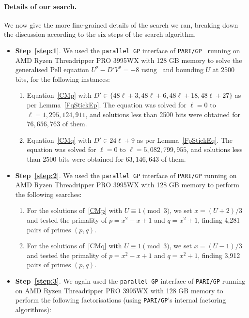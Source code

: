 \documentclass[version=preprint]{iacrcc}
\begin{document}
\paragraph{Details of our search.} We now give the more fine-grained details of the search we ran, breaking down the discussion according to the six steps of the search algorithm. 

\begin{itemize}
\item {\bf Step~\ref{step:1}}. We used the \texttt{parallel GP} interface of \texttt{PARI/GP}~\cite{PARI2} running on AMD Ryzen Threadripper PRO 3995WX with 128 GB memory to solve the generalised Pell equation $U^2-D'V^2=-8$ using~\cite[Algorithm 1]{DBLP:conf/ants/KarabinaT08} and bounding $U$ at 2500 bits, for the following instances:

\begin{enumerate}[label=(\roman*)]
\item Equation~\eqref{CMp} with $D' \in \{48\ell+3, 48\ell+6, 48\ell+18, 48\ell+27\}$ as per Lemma~\ref{FqStickEp}. The equation was solved for $\ell=0$ to $\ell=1,295,124,911$, and solutions less than 2500 bits were obtained for $76,656,763$ of them. 
\item Equation~\eqref{CMq} with $D' \in 24\ell+9$ as per Lemma~\ref{FpStickEq}. The equation was solved for $\ell=0$ to $\ell=5,082,799,955$, and solutions less than 2500 bits were obtained for $63,146,643$ of them. 
\end{enumerate}
\item {\bf Step~\ref{step:2}}. We used the \texttt{parallel GP} interface of \texttt{PARI/GP} running on AMD Ryzen Threadripper PRO 3995WX with 128 GB memory to perform the following searches:
\begin{enumerate}[label=(\roman*)]
\item For the solutions of~\eqref{CMp} with $U \equiv 1\pmod{3}$, we set $x=(U+2)/3$ and tested the primality of $p=x^2-x+1$ and $q=x^2+1$, finding 4,281 pairs of primes $(p,q)$. 
\item For the solutions of~\eqref{CMq} with $U \equiv 1\pmod{3}$, we set $x=(U-1)/3$ and tested the primality of $p=x^2-x+1$ and $q=x^2+1$, finding 3,912 pairs of primes $(p,q)$.
\end{enumerate}
\item {\bf Step~\ref{step:3}}. We again used the \texttt{parallel GP} interface of \texttt{PARI/GP} running on AMD Ryzen Threadripper PRO 3995WX with 128 GB memory to perform the following factorisations (using \texttt{PARI/GP}'s internal factoring algorithms):

\end{itemize}
\end{document}

